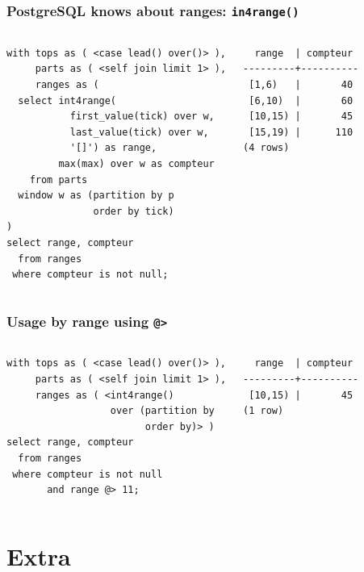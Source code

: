 \documentclass{beamer}
\begin{document}
\begin{frame}[fragile]
  \frametitle{PostgreSQL knows about ranges: \texttt{in4range()}}

\begin{columns}
\begin{verbatim}
with tops as ( <case lead() over()> ),
     parts as ( <self join limit 1> ),
     ranges as (
  select int4range(
           first_value(tick) over w,
           last_value(tick) over w,
           '[]') as range,
         max(max) over w as compteur
    from parts
  window w as (partition by p
               order by tick)
)
select range, compteur
  from ranges
 where compteur is not null;
\end{verbatim}
\begin{verbatim}
  range  | compteur 
---------+----------
 [1,6)   |       40
 [6,10)  |       60
 [10,15) |       45
 [15,19) |      110
(4 rows)
\end{verbatim}
\end{columns}
\end{frame}

\begin{frame}[fragile]
  \frametitle{Usage by range using \texttt{@>}}

\begin{columns}
\begin{verbatim}
with tops as ( <case lead() over()> ),
     parts as ( <self join limit 1> ),
     ranges as ( <int4range()
                  over (partition by
                        order by)> )
select range, compteur
  from ranges
 where compteur is not null
       and range @> 11;
\end{verbatim}

\begin{verbatim}
  range  | compteur 
---------+----------
 [10,15) |       45
(1 row)
\end{verbatim}
\end{columns}
\end{frame}

\section{Extra}
\end{document}
